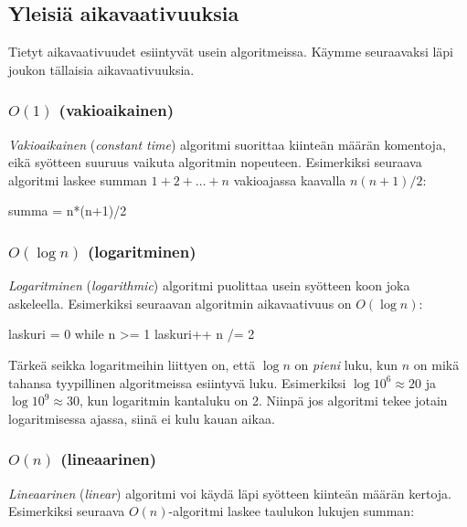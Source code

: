 \subsection{Yleisiä aikavaativuuksia}

Tietyt aikavaativuudet esiintyvät usein algoritmeissa.
Käymme seuraavaksi läpi joukon tällaisia aikavaativuuksia.


\subsubsection{$O(1)$ (vakioaikainen)}

\emph{Vakioaikainen} (\emph{constant time}) algoritmi suorittaa kiinteän määrän komentoja,
eikä syötteen suuruus vaikuta algoritmin nopeuteen.
Esimerkiksi seuraava algoritmi laskee summan $1+2+\dots+n$
vakioajassa kaavalla $n(n+1)/2$:

\begin{code}
summa = n*(n+1)/2
\end{code}


\subsubsection{$O(\log n)$ (logaritminen)}

\emph{Logaritminen} (\emph{logarithmic}) algoritmi puolittaa usein syötteen koon
joka askeleella.
Esimerkiksi seuraavan algoritmin aikavaativuus on $O(\log n)$:

\begin{code}
laskuri = 0
while n >= 1
    laskuri++
    n /= 2
\end{code}

Tärkeä seikka logaritmeihin liittyen on, että
$\log n$ on \emph{pieni} luku, kun $n$ on mikä tahansa 
tyypillinen algoritmeissa esiintyvä luku.
Esimerkiksi $\log 10^6 \approx 20$ ja $\log 10^9 \approx 30$,
kun logaritmin kantaluku on 2.
Niinpä jos algoritmi tekee jotain logaritmisessa ajassa,
siinä ei kulu kauan aikaa.


\subsubsection{$O(n)$ (lineaarinen)}

\emph{Lineaarinen} (\emph{linear}) algoritmi voi käydä läpi syötteen kiinteän määrän kertoja.
Esimerkiksi seuraava $O(n)$-algoritmi laskee taulukon lukujen summan:

